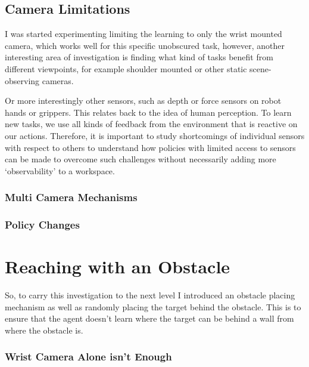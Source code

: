 \subsection{Camera Limitations}

I was started experimenting limiting the learning to only the wrist mounted camera, which works well for this specific unobscured task, however, another interesting area of investigation is finding what kind of tasks benefit from different viewpoints, for example shoulder mounted or other static scene-observing cameras. 

Or more interestingly other sensors, such as depth or force sensors on robot hands or grippers. This relates back to the idea of human perception. To learn new tasks, we use all kinds of feedback from the environment that is reactive on our actions. Therefore, it is important to study shortcomings of individual sensors with respect to others to understand how policies with limited access to sensors can be made to overcome such challenges without necessarily adding more `observability' to a workspace.

\subsubsection{Multi Camera Mechanisms}
\subsubsection{Policy Changes}


\section{Reaching with an Obstacle}
So, to carry this investigation to the next level I introduced an obstacle placing mechanism as well as randomly placing the target behind the obstacle. This is to ensure that the agent doesn't learn where the target can be behind a wall from where the obstacle is.



\subsubsection{Wrist Camera Alone isn't Enough}

